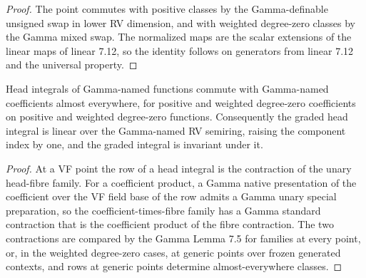 \begin{proof}


\leanok

The point commutes with positive classes by the Gamma-definable unsigned swap in lower RV dimension, and with weighted degree-zero classes by the Gamma mixed swap. The normalized maps are the scalar extensions of the linear maps of linear 7.12, so the identity follows on generators from linear 7.12 and the universal property.

\end{proof}

\begin{theorem}

\label{s7-gn-head-linear}


\leanok

Head integrals of Gamma-named functions commute with Gamma-named coefficients almost everywhere, for positive and weighted degree-zero coefficients on positive and weighted degree-zero functions. Consequently the graded head integral is linear over the Gamma-named RV semiring, raising the component index by one, and the graded integral is invariant under it.

\end{theorem}

\begin{proof}


\leanok

At a VF point the row of a head integral is the contraction of the unary head-fibre family. For a coefficient product, a Gamma native presentation of the coefficient over the VF field base of the row admits a Gamma unary special preparation, so the coefficient-times-fibre family has a Gamma standard contraction that is the coefficient product of the fibre contraction. The two contractions are compared by the Gamma Lemma 7.5 for families at every point, or, in the weighted degree-zero cases, at generic points over frozen generated contexts, and rows at generic points determine almost-everywhere classes.

\end{proof}

